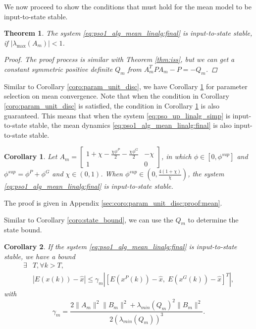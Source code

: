 \documentclass{sig-alternate}
\newtheorem{mythm}{Theorem}
\newtheorem{mycoro}{Corollary}
\begin{document}
We now proceed to show the conditions that must hold for the mean model to be input-to-state stable.
\begin{mythm}
\label{thm:iss:mean}
	The system \eqref{eq:pso1_alg_mean_linalg:final} is input-to-state stable, if $ | \lambda_{\max} ( A_{m} ) | < 1 $.
	\begin{proof}
		The proof process is similar with Theorem \ref{thm:iss}, but we can get a constant symmetric positive definite $ Q_{m} $ from $ A_{m}^{T} P A_{m} - P = - Q_{m} $.
	\end{proof}
\end{mythm}


Similar to Corollary \ref{coro:param_unit_disc}, we have Corollary \ref{coro:param_unit_disc:mean} for parameter selection on mean convergence.
Note that when the condition in Corollary \ref{coro:param_unit_disc} is satisfied, the condition in Corollary \ref{coro:param_unit_disc:mean} is also guaranteed.
This means that when the system \eqref{eq:pso_up_linalg_simp} is input-to-state stable, the mean dynamics \eqref{eq:pso1_alg_mean_linalg:final} is also input-to-state stable.

\begin{mycoro}
\label{coro:param_unit_disc:mean}
Let $ A_{m} = \begin{bmatrix}
1 + \chi - \frac{ \chi \phi^{P} }{2} - \frac{ \chi \phi^{G} }{2} & -\chi \\
1 & 0
\end{bmatrix} 
$, in which
$ \phi \in [0,  \phi^{sup} ] $ and $ \phi^{sup} = \phi^{P} + \phi^{G} $ and $ \chi \in ( 0, 1 ) $.
When $ \phi^{sup} \in \left( 0 , \frac{4(1+\chi)}{\chi} \right) $, the system \eqref{eq:pso1_alg_mean_linalg:final} is input-to-state stable.
\end{mycoro}
The proof is given in Appendix \ref{sec:coro:param_unit_disc:proof:mean}.


Similar to Corollary \ref{coro:state_bound}, we can use the $ Q_{m} $ to determine the state bound.
\begin{mycoro}
\label{coro:bound:mean}
If the system \eqref{eq:pso1_alg_mean_linalg:final} is input-to-state stable, we have a bound 
\begin{equation}
\begin{aligned}
\exists & T , \forall  k > T, \\
& | E( x(k) ) - \hat{x} | \leq  \gamma_{m} | \left[ E( x^{P}(k) ) - \hat{x} , \; E( x^{G}(k) ) - \hat{x} \right]^{T} |,
\end{aligned}
\end{equation}
with 
\begin{equation}
\gamma_{m} = \frac{ 2 \lVert A_{m} \rVert^{2} \lVert B_{m} \rVert^{2} + \lambda_{min}( Q_{m} )^{2} \lVert B_{m} \rVert^{2} }{ 2( \lambda_{min}( Q_{m} ) )^{3} }.
\end{equation}
\end{mycoro}
\end{document}

